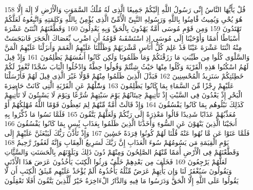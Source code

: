 \documentclass[20pt,a4paper]{article}
\begin{document}
{\tiny\colorbox{cl_aya}{158}} قُلْ يَأَيُّهَا النَّاسُ إِنِّى رَسُولُ اللَّهِ إِلَيْكُمْ جَمِيعًا الَّذِى لَهُ مُلْكُ السَّمَوَتِ وَالْأَرْضِ لَا إِلَهَ إِلَّا هُوَ يُحْىِ وَيُمِيتُ فََٔامِنُوا بِاللَّهِ وَرَسُولِهِ النَّبِىِّ الْأُمِّىِّ الَّذِى يُؤْمِنُ بِاللَّهِ وَكَلِمَتِهِ وَاتَّبِعُوهُ لَعَلَّكُمْ تَهْتَدُونَ
{\tiny\colorbox{cl_aya}{159}} وَمِن قَوْمِ مُوسَى أُمَّةٌ يَهْدُونَ بِالْحَقِّ وَبِهِ يَعْدِلُونَ
{\tiny\colorbox{cl_aya}{160}} وَقَطَّعْنَهُمُ اثْنَتَىْ عَشْرَةَ أَسْبَاطًا أُمَمًا وَأَوْحَيْنَا إِلَى مُوسَى إِذِ اسْتَسْقَىهُ قَوْمُهُ أَنِ اضْرِب بِّعَصَاكَ الْحَجَرَ فَانبَجَسَتْ مِنْهُ اثْنَتَا عَشْرَةَ عَيْنًا قَدْ عَلِمَ كُلُّ أُنَاسٍ مَّشْرَبَهُمْ وَظَلَّلْنَا عَلَيْهِمُ الْغَمَمَ وَأَنزَلْنَا عَلَيْهِمُ الْمَنَّ وَالسَّلْوَى كُلُوا مِن طَيِّبَتِ مَا رَزَقْنَكُمْ وَمَا ظَلَمُونَا وَلَكِن كَانُوا أَنفُسَهُمْ يَظْلِمُونَ
{\tiny\colorbox{cl_aya}{161}} وَإِذْ قِيلَ لَهُمُ اسْكُنُوا هَذِهِ الْقَرْيَةَ وَكُلُوا مِنْهَا حَيْثُ شِئْتُمْ وَقُولُوا حِطَّةٌ وَادْخُلُوا الْبَابَ سُجَّدًا نَّغْفِرْ لَكُمْ خَطِئَتِكُمْ سَنَزِيدُ الْمُحْسِنِينَ
{\tiny\colorbox{cl_aya}{162}} فَبَدَّلَ الَّذِينَ ظَلَمُوا مِنْهُمْ قَوْلًا غَيْرَ الَّذِى قِيلَ لَهُمْ فَأَرْسَلْنَا عَلَيْهِمْ رِجْزًا مِّنَ السَّمَاءِ بِمَا كَانُوا يَظْلِمُونَ
{\tiny\colorbox{cl_aya}{163}} وَسَْٔلْهُمْ عَنِ الْقَرْيَةِ الَّتِى كَانَتْ حَاضِرَةَ الْبَحْرِ إِذْ يَعْدُونَ فِى السَّبْتِ إِذْ تَأْتِيهِمْ حِيتَانُهُمْ يَوْمَ سَبْتِهِمْ شُرَّعًا وَيَوْمَ لَا يَسْبِتُونَ لَا تَأْتِيهِمْ كَذَلِكَ نَبْلُوهُم بِمَا كَانُوا يَفْسُقُونَ
{\tiny\colorbox{cl_aya}{164}} وَإِذْ قَالَتْ أُمَّةٌ مِّنْهُمْ لِمَ تَعِظُونَ قَوْمًا اللَّهُ مُهْلِكُهُمْ أَوْ مُعَذِّبُهُمْ عَذَابًا شَدِيدًا قَالُوا مَعْذِرَةً إِلَى رَبِّكُمْ وَلَعَلَّهُمْ يَتَّقُونَ
{\tiny\colorbox{cl_aya}{165}} فَلَمَّا نَسُوا مَا ذُكِّرُوا بِهِ أَنجَيْنَا الَّذِينَ يَنْهَوْنَ عَنِ السُّوءِ وَأَخَذْنَا الَّذِينَ ظَلَمُوا بِعَذَابٍ بَِٔيسٍ بِمَا كَانُوا يَفْسُقُونَ
{\tiny\colorbox{cl_aya}{166}} فَلَمَّا عَتَوْا عَن مَّا نُهُوا عَنْهُ قُلْنَا لَهُمْ كُونُوا قِرَدَةً خَسِِٔينَ
{\tiny\colorbox{cl_aya}{167}} وَإِذْ تَأَذَّنَ رَبُّكَ لَيَبْعَثَنَّ عَلَيْهِمْ إِلَى يَوْمِ الْقِيَمَةِ مَن يَسُومُهُمْ سُوءَ الْعَذَابِ إِنَّ رَبَّكَ لَسَرِيعُ الْعِقَابِ وَإِنَّهُ لَغَفُورٌ رَّحِيمٌ
{\tiny\colorbox{cl_aya}{168}} وَقَطَّعْنَهُمْ فِى الْأَرْضِ أُمَمًا مِّنْهُمُ الصَّلِحُونَ وَمِنْهُمْ دُونَ ذَلِكَ وَبَلَوْنَهُم بِالْحَسَنَتِ وَالسَّئَِّاتِ لَعَلَّهُمْ يَرْجِعُونَ
{\tiny\colorbox{cl_aya}{169}} فَخَلَفَ مِن بَعْدِهِمْ خَلْفٌ وَرِثُوا الْكِتَبَ يَأْخُذُونَ عَرَضَ هَذَا الْأَدْنَى وَيَقُولُونَ سَيُغْفَرُ لَنَا وَإِن يَأْتِهِمْ عَرَضٌ مِّثْلُهُ يَأْخُذُوهُ أَلَمْ يُؤْخَذْ عَلَيْهِم مِّيثَقُ الْكِتَبِ أَن لَّا يَقُولُوا عَلَى اللَّهِ إِلَّا الْحَقَّ وَدَرَسُوا مَا فِيهِ وَالدَّارُ الْءَاخِرَةُ خَيْرٌ لِّلَّذِينَ يَتَّقُونَ أَفَلَا تَعْقِلُونَ
\end{document}
